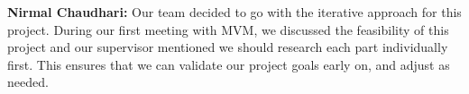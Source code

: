 \documentclass{article}
\begin{document}
\begin{enumerate}
    \textbf{Nirmal Chaudhari:} Our team decided to go with the iterative approach for this project. 
    During our first meeting with MVM, we discussed the feasibility of this project and our supervisor mentioned we should research each part individually first. 
    This ensures that we can validate our project goals early on, and adjust as needed. 

\end{enumerate}  



\end{document}
